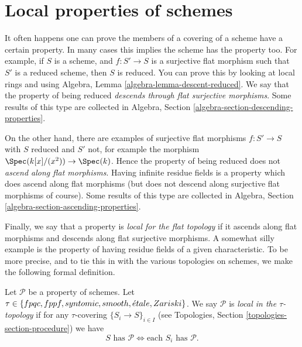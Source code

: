 \section{Local properties of schemes}
\label{section-descending-properties}

\noindent
It often happens one can prove the members of a covering of a scheme
have a certain property. In many cases this implies the scheme has the
property too. For example, if $S$ is a scheme, and $f : S' \to S$
is a surjective flat morphism such that $S'$ is a reduced scheme, then $S$ is
reduced. You can prove this by looking at local rings and using
Algebra, Lemma \ref{algebra-lemma-descent-reduced}.
We say that the property of being reduced
{\it descends through flat surjective morphisms}.
Some results of this type are collected in
Algebra, Section \ref{algebra-section-descending-properties}.

\medskip\noindent
On the other hand, there are examples of surjective flat morphisms
$f : S' \to S$ with $S$ reduced and $S'$ not, for example the morphism
$\Spec(k[x]/(x^2)) \to \Spec(k)$. Hence the property of
being reduced does not {\it ascend along flat morphisms}. Having infinite
residue fields is a property which does ascend along flat morphisms (but
does not descend along surjective flat morphisms of course). Some results
of this type are collected in
Algebra, Section \ref{algebra-section-ascending-properties}.

\medskip\noindent
Finally, we say that a property is {\it local for the flat topology}
if it ascends along flat morphisms and descends along flat surjective
morphisms. A somewhat silly example is the property of having residue
fields of a given characteristic. To be more precise, and to tie this in
with the various topologies on schemes, we make the following
formal definition.

\begin{definition}
\label{definition-property-local}
Let $\mathcal{P}$ be a property of schemes. Let
$\tau \in \{fpqc, \linebreak[0] fppf, \linebreak[0] syntomic, \linebreak[0]
smooth, \linebreak[0] \acute{e}tale, \linebreak[0] Zariski\}$.
We say $\mathcal{P}$ is {\it local in the $\tau$-topology} if for any
$\tau$-covering $\{S_i \to S\}_{i \in I}$ (see
Topologies, Section \ref{topologies-section-procedure})
we have
$$
S \text{ has }\mathcal{P}
\Leftrightarrow
\text{each }S_i \text{ has }\mathcal{P}.
$$
\end{definition}

